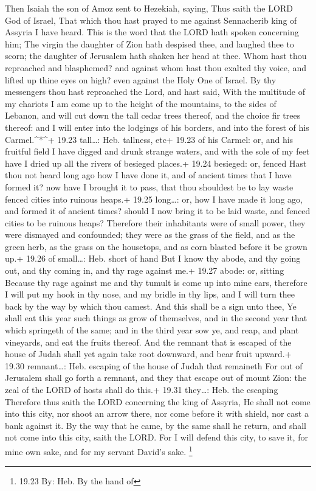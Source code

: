  Then Isaiah the son of Amoz sent to Hezekiah, saying, Thus
saith the LORD God of Israel, That which thou hast prayed to me against
Sennacherib king of Assyria I have heard.  This is the word
that the LORD hath spoken concerning him; The virgin the daughter of
Zion hath despised thee, and laughed thee to scorn; the daughter of
Jerusalem hath shaken her head at thee.  Whom hast thou
reproached and blasphemed? and against whom hast thou exalted thy voice,
and lifted up thine eyes on high? even against the Holy One of Israel.
 By thy messengers thou hast reproached the Lord, and hast
said, With the multitude of my chariots I am come up to the height of
the mountains, to the sides of Lebanon, and will cut down the tall cedar
trees thereof, and the choice fir trees thereof: and I will enter into
the lodgings of his borders, and into the forest of his
Carmel.\^{}*\^{}+ 19.23 tall\ldots: Heb. tallness, etc+ 19.23 of his
Carmel: or, and his fruitful field  I have digged and drunk
strange waters, and with the sole of my feet have I dried up all the
rivers of besieged places.+ 19.24 besieged: or, fenced 
Hast thou not heard long ago how I have done it, and of ancient times
that I have formed it? now have I brought it to pass, that thou
shouldest be to lay waste fenced cities into ruinous heaps.+ 19.25
long\ldots: or, how I have made it long ago, and formed it of ancient
times? should I now bring it to be laid waste, and fenced cities to be
ruinous heaps?  Therefore their inhabitants were of small
power, they were dismayed and confounded; they were as the grass of the
field, and as the green herb, as the grass on the housetops, and as corn
blasted before it be grown up.+ 19.26 of small\ldots: Heb. short of hand
 But I know thy abode, and thy going out, and thy coming
in, and thy rage against me.+ 19.27 abode: or, sitting 
Because thy rage against me and thy tumult is come up into mine ears,
therefore I will put my hook in thy nose, and my bridle in thy lips, and
I will turn thee back by the way by which thou camest.  And
this shall be a sign unto thee, Ye shall eat this year such things as
grow of themselves, and in the second year that which springeth of the
same; and in the third year sow ye, and reap, and plant vineyards, and
eat the fruits thereof.  And the remnant that is escaped of
the house of Judah shall yet again take root downward, and bear fruit
upward.+ 19.30 remnant\ldots: Heb. escaping of the house of Judah that
remaineth  For out of Jerusalem shall go forth a remnant,
and they that escape out of mount Zion: the zeal of the LORD of hosts
shall do this.+ 19.31 they\ldots: Heb. the escaping 
Therefore thus saith the LORD concerning the king of Assyria, He shall
not come into this city, nor shoot an arrow there, nor come before it
with shield, nor cast a bank against it.  By the way that
he came, by the same shall he return, and shall not come into this city,
saith the LORD.  For I will defend this city, to save it,
for mine own sake, and for my servant David's sake. \footnote{19.23 By:
  Heb. By the hand of}

